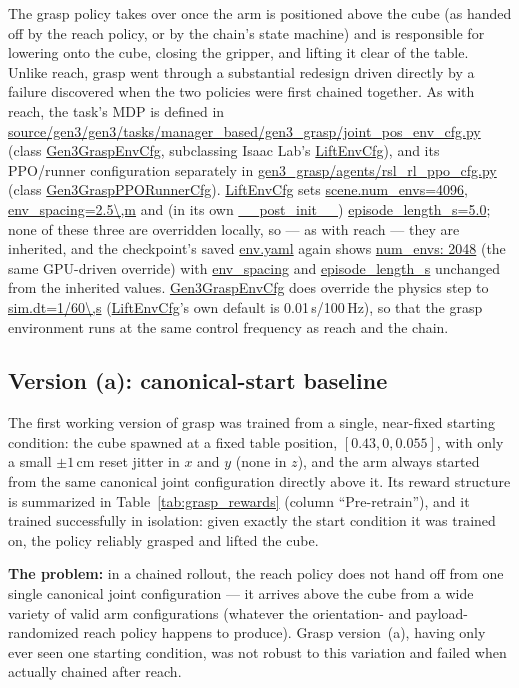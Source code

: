 \documentclass[11pt]{article}
\begin{document}
The grasp policy takes over once the arm is positioned above the cube (as handed
off by the reach policy, or by the chain's state machine) and is responsible for
lowering onto the cube, closing the gripper, and lifting it clear of the table.
Unlike reach, grasp went through a substantial redesign driven directly by a
failure discovered when the two policies were first chained together. As with
reach, the task's MDP is defined in
\url{source/gen3/gen3/tasks/manager_based/gen3_grasp/joint_pos_env_cfg.py}
(class \url{Gen3GraspEnvCfg}, subclassing Isaac Lab's \url{LiftEnvCfg}), and
its PPO/runner configuration separately in
\url{gen3_grasp/agents/rsl_rl_ppo_cfg.py} (class \url{Gen3GraspPPORunnerCfg}).
\url{LiftEnvCfg} sets \url{scene.num_envs=4096}, \url{env_spacing=2.5\,m}
and (in its own \url{__post_init__}) \url{episode_length_s=5.0}; none of
these three are overridden locally, so --- as with reach --- they are inherited, and
the checkpoint's saved \url{env.yaml} again shows \url{num_envs: 2048} (the
same GPU-driven override) with \url{env_spacing} and \url{episode_length_s}
unchanged from the inherited values. \url{Gen3GraspEnvCfg} does override the
physics step to \url{sim.dt=1/60\,s} (\url{LiftEnvCfg}'s own default is
0.01\,s/100\,Hz), so that the grasp environment runs at the same control frequency
as reach and the chain.

\subsection{Version (a): canonical-start baseline}
\label{sec:grasp_a}

The first working version of grasp was trained from a single, near-fixed starting
condition: the cube spawned at a fixed table position, $[0.43, 0, 0.055]$, with
only a small $\pm1$\,cm reset jitter in $x$ and $y$ (none in $z$), and the arm
always started from the same canonical joint configuration directly above it. Its
reward structure is summarized in Table~\ref{tab:grasp_rewards} (column ``Pre-retrain''),
and it trained successfully in isolation: given exactly the start condition it was
trained on, the policy reliably grasped and lifted the cube.

\textbf{The problem:} in a chained rollout, the reach policy does not hand off from
one single canonical joint configuration --- it arrives above the cube from a wide
variety of valid arm configurations (whatever the orientation- and
payload-randomized reach policy happens to produce). Grasp version~(a), having
only ever seen one starting condition, was not robust to this variation and failed
when actually chained after reach.
\end{document}
